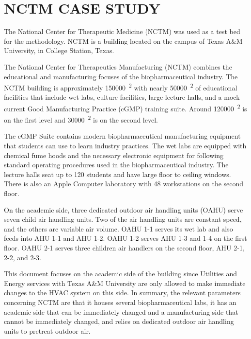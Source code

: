 \chapter{\texorpdfstring{\MakeUppercase{NCTM Case Study}}{NCTM Case Study}}
The National Center for Therapeutic Medicine (NCTM) was used as a test
bed for the methodology. NCTM is a building located on the
campus of Texas A\&M University, in College Station, Texas. 

The National Center for Therapeutics Manufacturing (NCTM) combines the
educational and manufacturing focuses of the biopharmaceutical industry.  The
NCTM building is approximately \SI{150000}{\feet\squared} with nearly
\SI{50000}{\feet\squared} of educational facilities that include wet labs,
culture facilities, large lecture halls, and a mock current Good Manufacturing
Practice (cGMP) training suite. Around \SI{120000}{\feet\squared} is on the
first level and \SI{30000}{\feet\squared} is on the second level. 

The cGMP Suite contains modern biopharmaceutical manufacturing equipment
that students can use to learn industry practices. The wet labs are
equipped with chemical fume hoods and the necessary electronic equipment
for following standard operating procedures used in the
biopharmaceutical industry. The lecture halls seat up to 120 students
and have large floor to ceiling windows. There is also an Apple Computer
laboratory with 48 workstations on the second floor. 

On the academic side, three dedicated outdoor air handling
units (OAHU) serve seven child air handling units. Two of the air handling
units are constant speed, and the others are variable air volume. OAHU
1-1 serves its wet lab and also feeds into AHU 1-1 and AHU 1-2. OAHU
1-2 serves AHU 1-3 and 1-4 on the first floor. OAHU 2-1 serves three
children air handlers on the second floor, AHU 2-1, 2-2, and 2-3. 

This document focuses on the academic side of the building since
Utilities and Energy services with Texas A\&M University are only
allowed to make immediate changes to the HVAC system on this side. In
summary, the relevant parameters concerning NCTM are that it houses
several biopharmaceutical labs, it has an academic side that can be
immediately changed and a manufacturing side that cannot be immediately
changed, and relies on dedicated outdoor air handling units to pretreat
outdoor air. 


